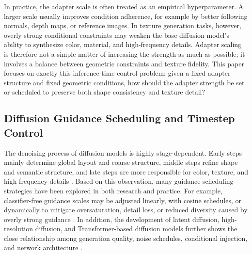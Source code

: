 \documentclass[times,twocolumn,final]{elsarticle}
\begin{document}
In practice, the adapter scale is often treated as an empirical hyperparameter. A larger scale usually improves condition adherence, for example by better following normals, depth maps, or reference images. In texture generation tasks, however, overly strong conditional constraints may weaken the base diffusion model's ability to synthesize color, material, and high-frequency details. Adapter scaling is therefore not a simple matter of increasing the strength as much as possible; it involves a balance between geometric constraints and texture fidelity. This paper focuses on exactly this inference-time control problem: given a fixed adapter structure and fixed geometric conditions, how should the adapter strength be set or scheduled to preserve both shape consistency and texture detail?

\subsection{Diffusion Guidance Scheduling and Timestep Control}
\label{subsec:guidance}

The denoising process of diffusion models is highly stage-dependent. Early steps mainly determine global layout and coarse structure, middle steps refine shape and semantic structure, and late steps are more responsible for color, texture, and high-frequency details \cite{ho2020ddpm,song2021ddim}. Based on this observation, many guidance scheduling strategies have been explored in both research and practice. For example, classifier-free guidance scales may be adjusted linearly, with cosine schedules, or dynamically to mitigate oversaturation, detail loss, or reduced diversity caused by overly strong guidance \cite{ho2022cfg,castillo2023adaptive}. In addition, the development of latent diffusion, high-resolution diffusion, and Transformer-based diffusion models further shows the close relationship among generation quality, noise schedules, conditional injection, and network architecture \cite{rombach2022ldm,esser2024scaling,blackforestlabs2024flux,loshchilov2019decoupled,cherti2023reproducible,nichol2022glide,saharia2022photorealistic,peebles2023scalable}.
\end{document}
